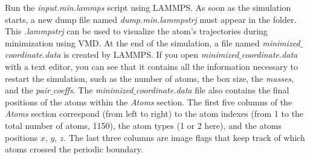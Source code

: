 \documentclass[9pt,tutorial]{livecoms}
\begin{document}
Run the \textit{input.min.lammps} script using LAMMPS. As soon as the simulation starts, a new dump file named \textit{dump.min.lammpstrj} must appear in the folder. This \textit{.lammpstrj} can be used to visualize the atom's trajectories during minimization using VMD. At the end of the simulation, a file named \textit{minimized$\_$coordinate.data} is created by LAMMPS. If you open \textit{minimized$\_$coordinate.data} with a text editor, you can see that it contains all the information necessary to restart the simulation, such as the number of atoms, the box size, the \textit{masses}, and the \textit{pair$\_$coeffs}.
The \textit{minimized$\_$coordinate.data} file also contains the final positions of the atoms within the \textit{Atoms} section. The first five columns of the \textit{Atoms} section correspond (from left to right) to the atom indexes (from 1 to the total number of atoms, 1150), the atom types (1 or 2 here), and the atoms positions $x$, $y$, $z$. The last three columns are image flags that keep track of which atoms crossed the periodic boundary.
\end{document}
